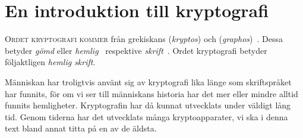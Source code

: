 
\chapter{En introduktion till kryptografi}
\lettrine{O}{rdet kryptografi kommer} från grekiskans  
(\emph{kryptos}) och  (\emph{graphos})~\cite{OED2013cg}.
Dessa betyder \emph{gömd} eller \emph{hemlig}~\cite{OED2013c} respektive 
\emph{skrift}~\cite{OED2013g}.
Ordet kryptografi betyder följaktligen \emph{hemlig skrift}.

Människan har troligtvis använt sig av kryptografi lika länge som skriftspråket 
har funnits, för om vi ser till människans historia har det mer eller mindre 
alltid funnits hemligheter.
Kryptografin har då kunnat utvecklats under väldigt lång tid.
Genom tiderna har det utvecklats många kryptoapparater, vi ska i denna text 
bland annat titta på en av de äldsta.









